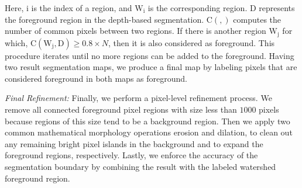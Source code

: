 	Here, $\mathrm{i}$ is the index of a region, and $\mathrm{W_i}$ is the corresponding region. $\mathrm{D}$ represents the foreground region in the depth-based segmentation. $\mathrm{C(,)}$ computes the number of common pixels between two regions. If there is another region $\mathrm{W_j}$ for which, $\mathrm{C(W_j,D)} \ge 0.8 \times N$, then it is also considered as foreground. This procedure iterates until no more regions can be added to the foreground. Having two result segmentation maps, we produce a final map by labeling pixels that are considered foreground in both maps as foreground.


	\vspace{.5em}
	\textit{Final Refinement:} Finally, we perform a pixel-level refinement process. We remove all connected foreground pixel regions with size less than $1000$ pixels because regions of this size tend to be a background region. Then we apply two common mathematical morphology operations erosion and dilation, to clean out any remaining bright pixel islands in the background and to expand the foreground regions, respectively. Lastly, we enforce the accuracy of the segmentation boundary by combining the result with the labeled watershed foreground region.












